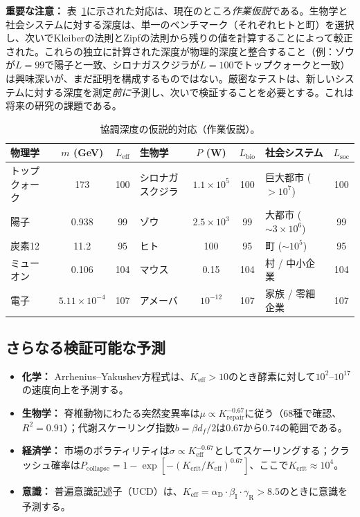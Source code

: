 \documentclass[11pt,a4paper]{article}
\theoremstyle{remark}
\newcommand{\Keff}{K_{\mathrm{eff}}}
\newcommand{\alD}{\alpha_{\mathrm{D}}}
\newcommand{\beI}{\beta_{\mathrm{I}}}
\newcommand{\gaR}{\gamma_{\mathrm{R}}}
\begin{document}
	\textbf{重要な注意：} 表~\ref{tab:universal_depths}に示された対応は、現在のところ\emph{作業仮説}である。生物学と社会システムに対する深度は、単一のベンチマーク（それぞれヒトと町）を選択し、次いでKleiberの法則とZipfの法則から残りの値を計算することによって較正された。これらの独立に計算された深度が物理的深度と整合すること（例：ゾウが\(L=99\)で陽子と一致、シロナガスクジラが\(L=100\)でトップクォークと一致）は興味深いが、まだ証明を構成するものではない。厳密なテストは、新しいシステムに対する深度を測定\emph{前に}予測し、次いで検証することを必要とする。これは将来の研究の課題である。
	
	\begin{table}[H]
		\centering
		\caption{協調深度の仮説的対応（作業仮説）。}
		\label{tab:universal_depths}
		\footnotesize
		\begin{tabular}{l c c l c c l c}
			\toprule
			\textbf{物理学} & \(m\) (GeV) & \(L_{\mathrm{eff}}\) & \textbf{生物学} & \(P\) (W) & \(L_{\mathrm{bio}}\) & \textbf{社会システム} & \(L_{\mathrm{soc}}\) \\
			\midrule
			トップクォーク & 173 & 100 & シロナガスクジラ & \(1.1\times10^5\) & 100 & 巨大都市 ($>10^7$) & 100 \\
			陽子 & 0.938 & 99 & ゾウ & \(2.5\times10^3\) & 99 & 大都市 ($\sim 3\times10^6$) & 99 \\
			炭素12 & 11.2 & 95 & ヒト & 100 & 95 & 町 ($\sim 10^5$) & 95 \\
			ミューオン & 0.106 & 104 & マウス & 0.15 & 104 & 村 / 中小企業 & 104 \\
			電子 & \(5.11\times10^{-4}\) & 107 & アメーバ & \(10^{-12}\) & 107 & 家族 / 零細企業 & 107 \\
			\bottomrule
		\end{tabular}
	\end{table}
	
	\subsection{さらなる検証可能な予測}
	
	\begin{itemize}
		\item \textbf{化学：} Arrhenius–Yakushev方程式は、\(\Keff > 10\)のとき酵素に対して\(10^2\)–\(10^{17}\)の速度向上を予測する。
		\item \textbf{生物学：} 脊椎動物にわたる突然変異率は\(\mu \propto K_{\text{repair}}^{-0.67}\)に従う（68種で確認、\(R^2=0.91\)）；代謝スケーリング指数\(b = \beta d_f/2\)は\(0.67\)から\(0.74\)の範囲である。
		\item \textbf{経済学：} 市場のボラティリティは\(\sigma \propto \Keff^{-0.67}\)としてスケーリングする；クラッシュ確率は\(P_{\text{collapse}} = 1 - \exp[-(K_{\text{crit}}/\Keff)^{0.67}]\)、ここで\(K_{\text{crit}} \approx 10^4\)。
		\item \textbf{意識：} 普遍意識記述子（UCD）は、\(\Keff = \alD \cdot \beI \cdot \gaR > 8.5\)のときに意識を予測する。
	\end{itemize}
	
\end{document}
